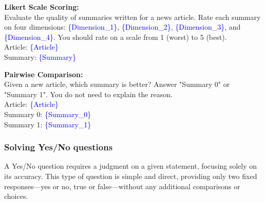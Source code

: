 \begin{tcolorbox}[colback=gray!10, colframe=gray!90!black, title={Evaluation Prompt Templates from \citet{human_like_summarization}}]
\textbf{Likert Scale Scoring:}\\
Evaluate the quality of summaries written for a news article. Rate each summary on four dimensions: \textcolor{blue}{\{Dimension\_1\}}, \textcolor{blue}{\{Dimension\_2\}}, \textcolor{blue}{\{Dimension\_3\}}, and \textcolor{blue}{\{Dimension\_4\}}. You should rate on a scale from 1 (worst) to 5 (best).\\
Article: \textcolor{blue}{\{Article\}} \\
Summary: \textcolor{blue}{\{Summary\}}

\vspace{6pt}
\textbf{Pairwise Comparison:}\\
Given a new article, which summary is better? Answer "Summary 0" or "Summary 1". You do not need to explain the reason.\\
Article: \textcolor{blue}{\{Article\}} \\
Summary 0: \textcolor{blue}{\{Summary\_0\}} \\
Summary 1: \textcolor{blue}{\{Summary\_1\}}
\end{tcolorbox}






\subsubsection{\textbf{Solving Yes/No questions}}




A Yes/No question requires a judgment on a given statement, focusing solely on its accuracy. This type of question is simple and direct, providing only two fixed responses—yes or no, true or false—without any additional comparisons or choices. 




